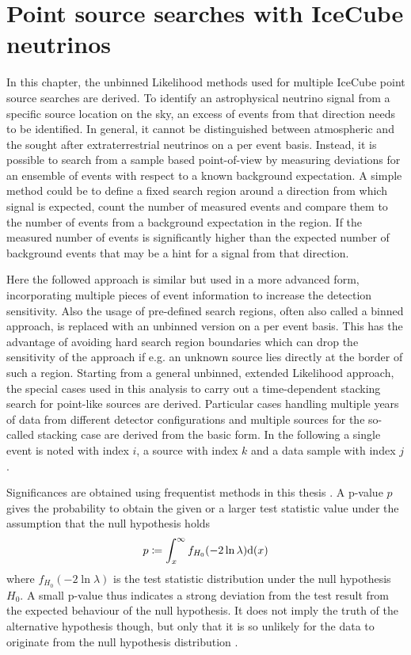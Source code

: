 \chapter{Point source searches with IceCube neutrinos}
In this chapter, the unbinned Likelihood methods used for multiple IceCube point source searches are derived.
To identify an astrophysical neutrino signal from a specific source location on the sky, an excess of events from that direction needs to be identified.
In general, it cannot be distinguished between atmospheric and the sought after extraterrestrial neutrinos on a per event basis.
Instead, it is possible to search from a sample based point-of-view by measuring deviations for an ensemble of events with respect to a known background expectation.
A simple method could be to define a fixed search region around a direction from which signal is expected, count the number of measured events and compare them to the number of events from a background expectation in the region.
If the measured number of events is significantly higher than the expected number of background events that may be a hint for a signal from that direction.

Here the followed approach is similar but used in a more advanced form, incorporating multiple pieces of event information to increase the detection sensitivity.
Also the usage of pre-defined search regions, often also called a binned approach, is replaced with an unbinned version on a per event basis.
This has the advantage of avoiding hard search region boundaries which can drop the sensitivity of the approach if e.g. an unknown source lies directly at the border of such a region.
Starting from a general unbinned, extended Likelihood approach, the special cases used in this analysis to carry out a time-dependent stacking search for point-like sources are derived.
Particular cases handling multiple years of data from different detector configurations and multiple sources for the so-called stacking case are derived from the basic form.
In the following a single event is noted with index $i$, a source with index $k$ and a data sample with index $j$.

Significances are obtained using frequentist methods in this thesis .
A p-value $p$ gives the probability to obtain the given or a larger test statistic value under the assumption that the null hypothesis holds
\begin{equation}
  p \coloneqq \int_x^\infty f_{H_0}(-2\ln\lambda) \mathrm{d}(x)
\end{equation}
where $f_{H_0}(-2\ln\lambda)$ is the test statistic distribution under the null hypothesis $H_0$.
A small p-value thus indicates a strong deviation from the test result from the expected behaviour of the null hypothesis.
It does not imply the truth of the alternative hypothesis though, but only that it is so unlikely for the data to originate from the null hypothesis distribution .

